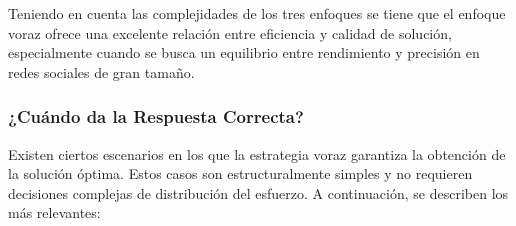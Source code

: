 \documentclass[11pt,letter]{article}
\begin{document}
    Teniendo en cuenta las complejidades de los tres enfoques se tiene que el enfoque voraz ofrece una excelente relación entre eficiencia y calidad de solución, especialmente cuando se busca un equilibrio entre rendimiento y precisión en redes sociales de gran tamaño.

    \subsubsection{¿Cuándo da la Respuesta Correcta?}

    Existen ciertos escenarios en los que la estrategia voraz garantiza la obtención de la solución óptima. Estos casos son estructuralmente simples y no requieren decisiones complejas de distribución del esfuerzo. A continuación, se describen los más relevantes:
    
\end{document}

